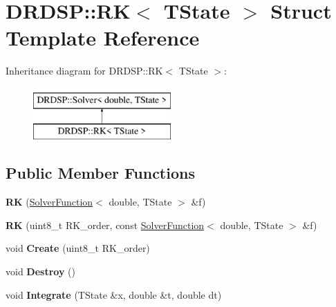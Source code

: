 \hypertarget{struct_d_r_d_s_p_1_1_r_k}{\section{D\-R\-D\-S\-P\-:\-:R\-K$<$ T\-State $>$ Struct Template Reference}
\label{struct_d_r_d_s_p_1_1_r_k}
}
Inheritance diagram for D\-R\-D\-S\-P\-:\-:R\-K$<$ T\-State $>$\-:\begin{figure}[H]
\begin{center}
\leavevmode
\includegraphics[height=2.000000cm]{struct_d_r_d_s_p_1_1_r_k}
\end{center}
\end{figure}
\subsection*{Public Member Functions}
\begin{DoxyCompactItemize}
\item 
\hypertarget{struct_d_r_d_s_p_1_1_r_k_a1cb82fb295a1f09c57d2d609784444c9}{{\bfseries R\-K} (\hyperlink{struct_d_r_d_s_p_1_1_solver_function}{Solver\-Function}$<$ double, T\-State $>$ \&f)}\label{struct_d_r_d_s_p_1_1_r_k_a1cb82fb295a1f09c57d2d609784444c9}

\item 
\hypertarget{struct_d_r_d_s_p_1_1_r_k_a4560ed112880dabb357dac85065470c5}{{\bfseries R\-K} (uint8\-\_\-t R\-K\-\_\-order, const \hyperlink{struct_d_r_d_s_p_1_1_solver_function}{Solver\-Function}$<$ double, T\-State $>$ \&f)}\label{struct_d_r_d_s_p_1_1_r_k_a4560ed112880dabb357dac85065470c5}

\item 
\hypertarget{struct_d_r_d_s_p_1_1_r_k_ad0031ee3d9abd083e2c6843bc66cdce5}{void {\bfseries Create} (uint8\-\_\-t R\-K\-\_\-order)}\label{struct_d_r_d_s_p_1_1_r_k_ad0031ee3d9abd083e2c6843bc66cdce5}

\item 
\hypertarget{struct_d_r_d_s_p_1_1_r_k_a389f4e279b3228ecd2aaae8d36f4ed87}{void {\bfseries Destroy} ()}\label{struct_d_r_d_s_p_1_1_r_k_a389f4e279b3228ecd2aaae8d36f4ed87}

\item 
\hypertarget{struct_d_r_d_s_p_1_1_r_k_a1a1a120ec2a39c1dd611dae123d01e85}{void {\bfseries Integrate} (T\-State \&x, double \&t, double dt)}\label{struct_d_r_d_s_p_1_1_r_k_a1a1a120ec2a39c1dd611dae123d01e85}

\end{DoxyCompactItemize}
